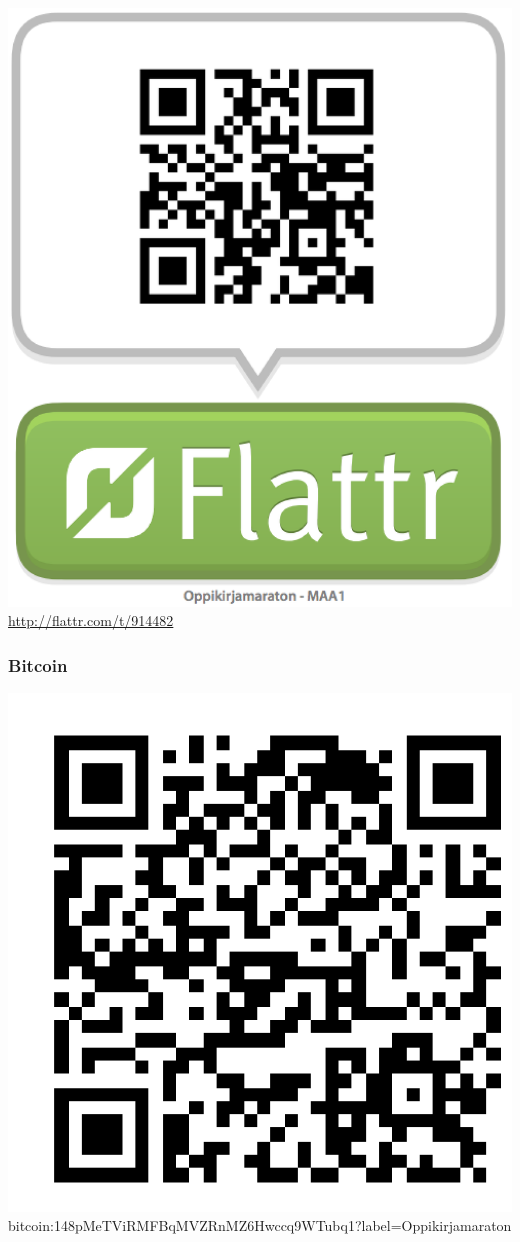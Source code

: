 \includegraphics[scale=0.2]{MAA1-Flattr.png} \\
\url{http://flattr.com/t/914482}

\subsubsection*{Bitcoin}

\includegraphics[scale=0.2]{Oppikirjamaraton-Bitcoin.png} \\
bitcoin:148pMeTViRMFBqMVZRnMZ6Hwccq9WTubq1?label=Oppikirjamaraton

